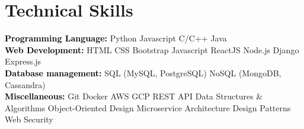 \documentclass[letterpaper,11pt]{article}
\newcommand{\cvskill}[2]{
  \textcolor{black}{\textbf{#1:}} {#2}\hfill \\
}
\begin{document}
\section{Technical Skills}
\cvskill{Programming Language}{Python \textbullet{}  Javascript \textbullet{} C/C++ \textbullet{} Java}
\cvskill{Web Development}{HTML \textbullet{} CSS \textbullet{} Bootstrap \textbullet{} Javascript \textbullet{} ReactJS \textbullet{} Node.js \textbullet{}  Django \textbullet{} Express.js}
\cvskill{Database management}{SQL (MySQL, PostgreSQL) \textbullet{} NoSQL (MongoDB, Cassandra)}
\cvskill{Miscellaneous}{Git \textbullet{} Docker \textbullet{} AWS \textbullet{}  GCP \textbullet{} REST API \textbullet{} Data Structures \& Algorithms \textbullet{} Object-Oriented Design \textbullet{} Microservice Architecture \textbullet{}  Design Patterns \textbullet{} Web Security}

\vspace{2pt}
\end{document}
